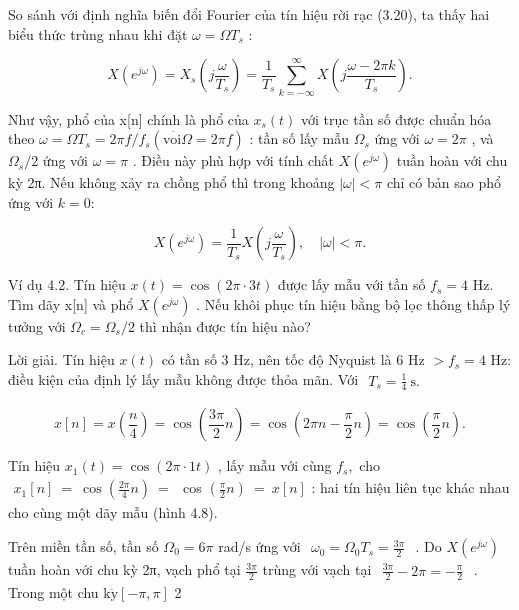 \documentclass[
  10
]{article}
\begin{document}
So sánh với định nghĩa biến đổi Fourier của tín hiệu rời rạc (3.20), ta
thấy hai biểu thức trùng nhau khi đặt \(\omega = \Omega T _ { s }\) :

\[
X (e ^ {j \omega}) = X _ {s} \left(j \frac {\omega}{T _ {s}}\right) = \frac {1}{T _ {s}} \sum_ {k = - \infty} ^ {\infty} X \left(j \frac {\omega - 2 \pi k}{T _ {s}}\right).
\]

Như vậy, phổ của x{[}n{]} chính là phổ của \(x _ { s } ( t )\) với trục
tần số được chuẩn hóa theo
\(\omega = \Omega T _ { s } = 2 \pi f / f _ { s } ( \mathrm { v } \dot { \mathrm { o i } } \Omega = 2 \pi f )\)
: tần số lấy mẫu \(\Omega _ { s }\) ứng với \(\omega = 2 \pi\) , và
\(\Omega _ { s } / 2\) ứng với \(\omega = \pi\) . Điều này phù hợp với
tính chất \(X ( e ^ { j \omega } )\) tuần hoàn với chu kỳ 2π. Nếu không
xảy ra chồng phổ thì trong khoảng \(| \omega | < \pi\) chỉ có bản sao
phổ ứng với \(k = 0 \mathrm { : }\)

\[
X (e ^ {j \omega}) = \frac {1}{T _ {s}} X \left(j \frac {\omega}{T _ {s}}\right), \quad | \omega | <   \pi .
\]

Ví dụ 4.2. Tín hiệu \(x ( t ) = \cos ( 2 \pi \cdot 3 t )\) được lấy mẫu
với tần số \(f _ { s } = 4\) Hz. Tìm dãy x{[}n{]} và phổ
\(X ( e ^ { j \omega } )\) . Nếu khôi phục tín hiệu bằng bộ lọc thông
thấp lý tưởng với \(\Omega _ { c } = \Omega _ { s } / 2\) thì nhận được
tín hiệu nào?

Lời giải. Tín hiệu \(x ( t )\) có tần số 3 Hz, nên tốc độ Nyquist là 6
Hz \(> f _ { s } = 4\) Hz: điều kiện của định lý lấy mẫu không được thỏa
mãn. Với
\(\begin{array} { r } { T _ { s } = \frac { 1 } { 4 } ~ \mathrm { s } . } \end{array}\)

\[
x [ n ] = x \left(\frac {n}{4}\right) = \cos \left(\frac {3 \pi}{2} n\right) = \cos \left(2 \pi n - \frac {\pi}{2} n\right) = \cos \left(\frac {\pi}{2} n\right).
\]

Tín hiệu \(x _ { 1 } ( t ) = \cos ( 2 \pi \cdot 1 t )\) , lấy mẫu với
cùng \(f _ { s } ,\) cho
\(\begin{array} { r } { x _ { 1 } [ n ] \ = \ \cos \left( \frac { 2 \pi } { 4 } n \right) \ = } \end{array}\)
cos
\(\textstyle { \left( { \frac { \pi } { 2 } } n \right) } \ = \ x [ n ]\)
: hai tín hiệu liên tục khác nhau cho cùng một dãy mẫu (hình  4.8).

Trên miền tần số, tần số \(\Omega _ { 0 } = 6 \pi\) rad/s ứng với
\(\begin{array} { r } { \omega _ { 0 } = \Omega _ { 0 } T _ { s } = \frac { 3 \pi } { 2 } } \end{array}\)
. Do \(X ( e ^ { j \omega } )\) tuần hoàn với chu kỳ 2π, vạch phổ tại
\(\frac { 3 \pi } { 2 }\) trùng với vạch tại
\(\begin{array} { r } { \frac { 3 \pi } { 2 } - 2 \pi = - \frac { \pi } { 2 } } \end{array}\)
. Trong một chu
\(\mathrm { k } \dot { \mathrm { y } } \left[ - \pi , \pi \right]\) 2
\end{document}
